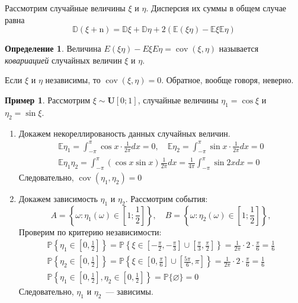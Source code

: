 \documentclass[oneside,final,14pt]{extreport}
\theoremstyle{plain}
\theoremstyle{definition}
\newtheorem*{defn}{Определение}
\newtheorem*{exmp}{Пример}
\theoremstyle{named}
\begin{document}
Рассмотрим случайные величины $\xi$ и $\eta$. Дисперсия их суммы в общем случае равна
\begin{equation*}
    \mathbb{D}(\xi+\mathrm{n})=\mathbb{D} \xi+\mathbb{D} \eta+2(\mathbb{E}(\xi \eta)-\mathbb{E} \xi \mathbb{E} \eta)
\end{equation*}
\begin{defn}
    Величина $E(\xi \eta)-E \xi E \eta = \operatorname{cov}(\xi, \eta)$ называется {\it ковариацией} случайных величин $\xi$ и $\eta$.
\end{defn}
Если $\xi$ и $\eta$ независимы, то $\operatorname{cov}(\xi, \eta) = 0$. Обратное, вообще говоря, неверно.
\begin{exmp}
    Рассмотрим $\xi \sim \mathbf{U}[0;1]$, случайные величины $\eta_{1}=\cos \xi$ и $\eta_{2}=\sin \xi$.
    \begin{enumerate}
        \item Докажем некореллированость данных случайных величин.
        \begin{gather*}
            \mathbb{E} \eta_{1}=\int_{-\pi}^{\pi} \cos x \cdot \frac{1}{2 \pi} d x=0, \quad \mathbb{E} \eta_{2}=\int_{-\pi}^{\pi} \sin x \cdot \frac{1}{2 \pi} d x=0 \\
            \mathbb{E} \eta_{1} \eta_{2}=\int_{-\pi}^{\pi}(\cos x \sin x) \frac{1}{2 \pi} d x=\frac{1}{4 \pi} \int_{-\pi}^{\pi} \sin 2 x d x=0
        \end{gather*}
        Следовательно, $\operatorname{cov}(\eta_1, \eta_2) = 0$
        \item Докажем зависимость $\eta_1$ и $\eta_2$. Рассмотрим события:
        \begin{equation*}
            A = \left\{ \omega: \eta_1(\omega) \in \left[1;\frac{1}{2} \right] \right\}, \quad
            B = \left\{ \omega: \eta_2(\omega) \in \left[1;\frac{1}{2} \right] \right\},
        \end{equation*}
        Проверим по критерию независимости:
        \begin{gather*}
            \mathbb{P}\left\{\eta_{1} \in\left[0, \frac{1}{2}\right]\right\}=\mathbb{P}\left\{\xi \in\left[-\frac{\pi}{2},-\frac{\pi}{3}\right] \cup\left[\frac{\pi}{3}, \frac{\pi}{2}\right]\right\}=\frac{1}{2 \pi} \cdot 2 \cdot \frac{\pi}{6}=\frac{1}{6} \\
            \mathbb{P}\left\{\eta_{2} \in\left[0, \frac{1}{2}\right]\right\}=\mathbb{P}\left\{\xi \in\left[0, \frac{\pi}{6}\right] \cup\left[\frac{5 \pi}{6}, \pi\right]\right\}=\frac{1}{2 \pi} \cdot 2 \cdot \frac{\pi}{6}=\frac{1}{6} \\
            \mathbb{P}\left\{\eta_{1} \in\left[0, \frac{1}{2}\right], \eta_{2} \in\left[0, \frac{1}{2}\right]\right\}=\mathbb{P}\{\varnothing\}=0
        \end{gather*}
        Следовательно, $\eta_1$ и $\eta_2$~--- зависимы.
    \end{enumerate}
\end{exmp}
\end{document}
